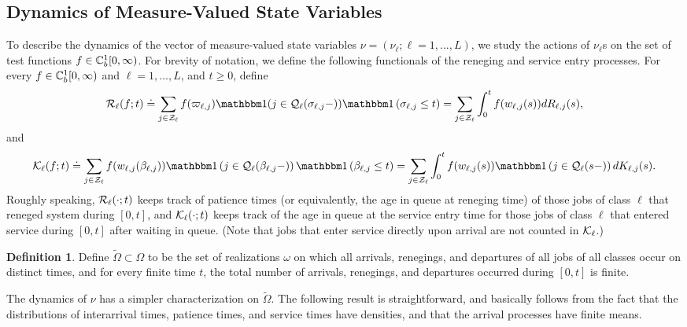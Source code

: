\documentclass{article}
\theoremstyle{definition}
\newtheorem{definition}[theorem]{Definition}
\numberwithin{equation}{section}
\begin{document}
\subsection{Dynamics of Measure-Valued State Variables}

To describe the dynamics of the vector of measure-valued state variables $\nu=(\nu_\ell;\ell=1,...,L)$, we study the actions of $\nu_\ell$s on the set of test functions $f\in\mathbb{C}_b^{1}[0,\infty)$. For brevity of notation, we define the following functionals of the reneging and service entry processes. For every $f\in\mathbb{C}_b^{1}[0,\infty)$ and $\ell=1,...,L$, and $t\geq0$, define
\begin{equation}\label{def_renegC}
  \renegC_\ell(f;t) \doteq\sum_{j\in\indexSet_\ell} f(\patience_{\ell,j})\indicil{j\in\inque_\ell(\renegtime_{\ell,j}-)}\indic{\renegtime_{\ell,j}\leq t}=  \sum_{j\in\indexSet_\ell} \int_0^tf(w_{\ell,j}(s))d\reneg_{\ell,j}(s),
\end{equation}
and
\begin{equation}\label{def_entryC}
\entryC_\ell(f;t)\doteq \sum_{j\in\indexSet_\ell} f(w_{\ell,j}(\entrytime_{\ell,j}))\indic{j\in\inque_\ell(\entrytime_{\ell,j}-)}\indic{\entrytime_{\ell,j}\leq t} = \sum_{j\in\indexSet_\ell} \int_0^tf(w_{\ell,j}(s))\indic{j\in\inque_\ell(s-)}d\entry_{\ell,j}(s).
\end{equation}
Roughly speaking, $\mathcal{R}_\ell(\cdot;t)$ keeps track of patience times (or equivalently, the age in queue at reneging time) of those jobs of class $\ell$ that reneged system during $[0,t]$, and $\mathcal{K}_\ell(\cdot;t)$ keeps track of the age in queue at the service entry time for those jobs of class $\ell$ that entered service during $[0,t]$ after waiting in queue. (Note that jobs that enter service directly upon arrival are not counted in $\mathcal{K}_\ell$.)

\begin{definition}
Define $\tilde\Omega\subset\Omega$ to be the set of realizations $\omega$ on which all arrivals, renegings, and departures of all jobs of all classes occur on distinct times, and for every finite time $t$, the total number of arrivals, renegings, and departures occurred during $[0,t]$ is finite.
\end{definition}
The dynamics of $\nu$ has a simpler characterization on $\tilde \Omega$. The following result is straightforward, and basically follows from the fact that the distributions of interarrival times, patience times, and service times have densities, and that the arrival processes have finite means.
\end{document}
